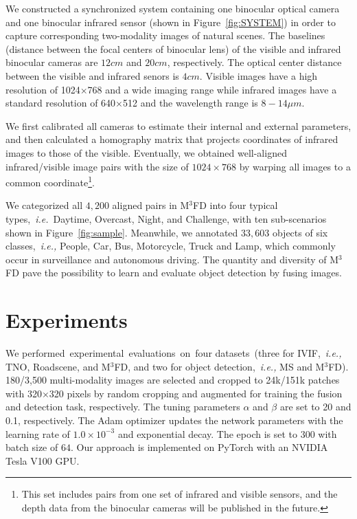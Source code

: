 \documentclass[10pt,twocolumn,letterpaper]{article}
\begin{document}
We constructed a synchronized system containing one binocular optical camera and one binocular infrared sensor (shown in Figure~\ref{fig:SYSTEM}) in order to capture corresponding two-modality images of natural scenes. The baselines (distance between the focal centers of binocular lens) of the visible and infrared binocular cameras are $12cm$ and $20cm$, respectively. The optical center distance between the visible and infrared senors is $4cm$. Visible images have a high resolution of 1024$\times$768 and a wide imaging range while infrared images have a standard resolution of 640$\times$512 and the wavelength range is $8-14\mu m$.

We first calibrated all cameras to estimate their internal and external parameters, and then calculated a homography matrix that projects coordinates of infrared images to those of the visible. Eventually, we obtained well-aligned infrared/visible image pairs with the size of $1024\times768$ by warping all images to a common coordinate\footnote{This set includes pairs from one set of infrared and visible sensors, and the depth data from the binocular cameras will be published in the future.}.

We categorized all $4,200$ aligned pairs in M$^3$FD into four typical types,~\emph{i.e.}~Daytime, Overcast, Night, and Challenge, with ten sub-scenarios shown in Figure~\ref{fig:sample}. Meanwhile, we annotated $33,603$ objects of six classes,~\emph{i.e.,} People, Car, Bus, Motorcycle, Truck and Lamp, which commonly occur in surveillance and autonomous driving. The quantity and diversity of M$^3$FD pave the possibility to learn and evaluate object detection by fusing images.


\section{Experiments}
We performed~experimental~evaluations~on~four datasets~(three for IVIF,~\emph{i.e.,} TNO, Roadscene, and M$^3$FD, and two for object detection,~\emph{i.e.,} MS and M$^3$FD). 180/3,500 multi-modality images are selected and cropped to 24k/151k patches with 320$\times$320 pixels by random cropping and augmented for training the fusion and detection task, respectively. The tuning parameters $\alpha$ and $\beta$ are set to 20 and 0.1, respectively. The Adam optimizer updates the network parameters with the learning rate of $1.0\times 10^{-3}$ and exponential decay. The epoch is set to $300$ with batch size of $64$. Our approach is implemented on PyTorch with an NVIDIA Tesla V100 GPU.
\end{document}
